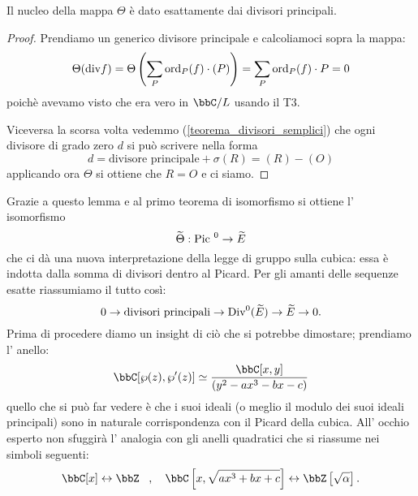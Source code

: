 
\begin{lemma}
Il nucleo della mappa $\Theta$ è dato esattamente dai divisori principali.
\end{lemma}
\begin{proof}
Prendiamo un generico divisore principale e calcoliamoci sopra la mappa:
$$
\Theta(\mbox{div} f)=\Theta\left(\sum_P \text{ord}_P(f) \cdot (P)\right)=\sum_P \text{ord}_P(f)\cdot P=0
$$
poichè avevamo visto che era vero in $\bbC/L$ usando il T3.

Viceversa la scorsa volta vedemmo (\ref{teorema_divisori_semplici}) che ogni divisore di grado zero $d$ si può scrivere nella forma
$$ d = \mbox{divisore principale} + \sigma(R) = (R) - (O) $$
applicando ora $\Theta$ si ottiene che $R=O$ e ci siamo.
\end{proof}


Grazie a questo lemma e al primo teorema di isomorfismo si ottiene l' isomorfismo
$$
\widetilde{\Theta}: \mbox{Pic }^0 \rightarrow \widetilde{E}
$$
che ci dà una nuova interpretazione della legge di gruppo sulla cubica: essa è indotta dalla somma di divisori dentro al Picard. Per gli amanti delle sequenze esatte riassumiamo il tutto così:
$$
0\rightarrow\mbox{divisori principali}\rightarrow \mbox{Div}^0(\widetilde{E})\rightarrow \widetilde{E}\rightarrow 0.
$$
Prima di procedere diamo un insight di ciò che si potrebbe dimostare; prendiamo l' anello:
$$
\bbC[\wp(z),\wp'(z)]\simeq\frac{\bbC[x,y]}{(y^2 - ax^3 - bx - c)}
$$
quello che si può far vedere è che i suoi ideali (o meglio il modulo dei suoi ideali principali) sono in naturale corrispondenza con il Picard della cubica. All' occhio esperto non sfuggirà l' analogia con gli anelli quadratici che si riassume nei simboli seguenti:
$$
\bbC[x] \leftrightarrow \bbZ\, \ \ , \ \ \ \bbC\left[x,\sqrt{ax^3+bx+c}\right] \leftrightarrow \bbZ\left[\sqrt{\alpha}\right].
$$
